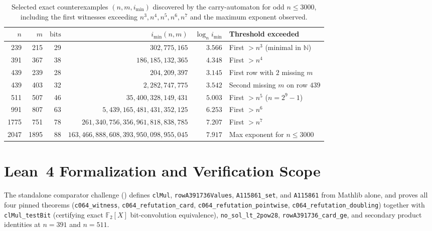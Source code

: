 \documentclass[11pt]{article}
\theoremstyle{definition}
\newcommand{\N}{\mathbb{N}}
\newcommand{\F}{\mathbb{F}}
\begin{document}
\begin{table}[h]
\centering
\small
\setlength{\tabcolsep}{4pt}
\caption{Selected exact counterexamples $(n, m, i_{\min})$ discovered by the carry-automaton for odd $n \le 3000$, including the first witnesses exceeding $n^3, n^4, n^5, n^6, n^7$ and the maximum exponent observed.}
\label{tab:witnesses}
\begin{tabular}{rrrrrl}
\toprule
$n$ & $m$ & $\mathrm{bits}$ & $i_{\min}(n, m)$ & $\log_n i_{\min}$ & Threshold exceeded \\
\midrule
239 & 215 & 29 & $302{,}775{,}165$ & $3.566$ & First $> n^3$ (minimal in $\N$) \\
391 & 367 & 38 & $186{,}185{,}132{,}365$ & $4.348$ & First $> n^4$ \\
439 & 239 & 28 & $204{,}209{,}397$ & $3.145$ & First row with $2$ missing $m$ \\
439 & 403 & 32 & $2{,}282{,}747{,}775$ & $3.542$ & Second missing $m$ on row $439$ \\
511 & 507 & 46 & $35{,}400{,}328{,}149{,}431$ & $5.003$ & First $> n^5$ ($n = 2^9 - 1$) \\
991 & 807 & 63 & $5{,}439{,}165{,}481{,}431{,}352{,}125$ & $6.253$ & First $> n^6$ \\
1775 & 751 & 78 & $261{,}340{,}756{,}356{,}961{,}818{,}838{,}785$ & $7.207$ & First $> n^7$ \\
2047 & 1895 & 88 & $163{,}466{,}888{,}608{,}393{,}950{,}098{,}955{,}045$ & $7.917$ & Max exponent for $n \le 3000$ \\
\bottomrule
\end{tabular}
\end{table}

\section{Lean~4 Formalization and Verification Scope}

{\sloppy
The standalone comparator challenge () defines \texttt{clMul}, \texttt{rowA391736Values}, \texttt{A115861\_set}, and \texttt{A115861} from Mathlib alone, and  proves all four pinned theorems (\texttt{c064\_witness}, \texttt{c064\_refutation\_card}, \texttt{c064\_refutation\_pointwise}, \texttt{c064\_refutation\_doubling}) together with \texttt{clMul\_testBit} (certifying exact $\F_2[X]$ bit-convolution equivalence), \texttt{no\_sol\_lt\_2pow28}, \texttt{rowA391736\_card\_ge}, and secondary product identities at $n = 391$ and $n = 511$.
\par}
\end{document}
